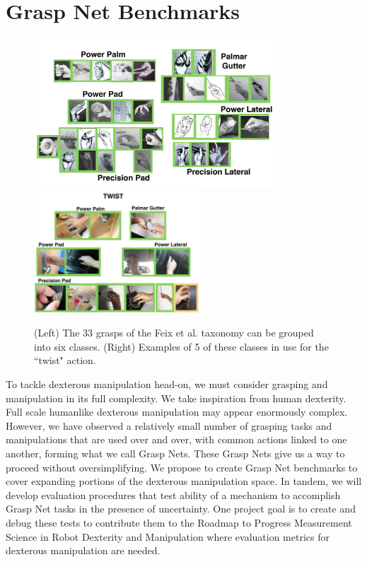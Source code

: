 \section{Grasp Net Benchmarks}   
    \label{secGraspNet}
 
\begin{figure}
\begin{center}
{\includegraphics[height=2.2in]{./figs/sixGraspTypes.png}}
{\includegraphics[height=1.8in]{./figs/twistGraspTypes.png}}
\end{center}
\vspace*{-0.2in}
\caption[]{(Left) The 33 grasps of the Feix et al. taxonomy \cite{feixgrasp} can be grouped into six classes. (Right) Examples of 5 of these classes in use for the ``twist" action.}
\label{GraspNet}
\end{figure}

To tackle dexterous manipulation head-on, we must consider grasping and manipulation in its full complexity.   We take inspiration from human dexterity.   Full scale humanlike dexterous manipulation may appear enormously complex.   However,  we have observed a relatively small number of grasping tasks and manipulations that are used over and over, with common actions linked to one another, forming what we call Grasp Nets.   These Grasp Nets give us a way to proceed without oversimplifying.  We propose to create Grasp Net benchmarks to cover expanding portions of the dexterous manipulation space.   In tandem, we will develop evaluation procedures that test ability of a mechanism to accomplish Grasp Net tasks in the presence of uncertainty.   One project goal is to create and debug these tests to contribute them to the Roadmap to Progress Measurement Science in Robot Dexterity and Manipulation \cite{falco2014roadmap} where evaluation metrics for dexterous manipulation are needed.   

